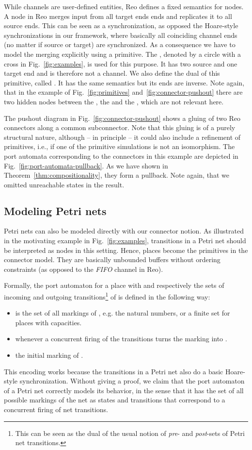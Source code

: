 \documentclass[copyright,creativecommons]{eptcs}
\begin{document}
While channels are user-defined
entities, Reo defines a fixed semantics for nodes.
A node in Reo merges input from all target ends
ends and replicates it to all source ends. This
can be seen as a  synchronization, 
as opposed the Hoare-style synchronizations
in our framework, where basically all
coinciding channel ends (no matter if source or target) 
are synchronized.
As a consequence we have to model the merging 
explicitly using a primitive. The ,
denoted by a circle with a cross in Fig.~\ref{fig:examples},
is used for this purpose. It has two source and one target end
and is therefore not a channel. We also define the dual
of this primitive, called . It has the same semantics
but its ends are inverse. Note again, that in the example
of Fig.~\ref{fig:primitives} and~\ref{fig:connector-pushout}
there are two hidden nodes between the , the 
and the , which are not relevant here.

The pushout diagram in Fig.~\ref{fig:connector-pushout} shows
a gluing of two Reo connectors along a common subconnector.
Note that this gluing is of a purely structural nature, 
although -- in principle -- it could also include a refinement of
primitives, i.e., if one of the primitive simulations is not 
an isomorphism. The port automata corresponding to the 
connectors in this example are depicted in
Fig.~\ref{fig:port-automata-pullback}. As we have shown 
in Theorem~\ref{thm:compositionality}, they form a pullback.
Note again, that we omitted unreachable states in the result.


\subsection{Modeling Petri nets}

Petri nets can also be modeled directly with our connector notion. As illustrated in the
motivating example in Fig.~\ref{fig:examples}, transitions in a Petri net
should be interpreted as nodes in this setting. Hence, places
become the primitives in the connector model. They are basically unbounded buffers
without ordering constraints (as opposed to the \emph{FIFO} channel in Reo). 


Formally, the port automaton
 for a place  with  and  respectively 
the sets of incoming and outgoing transitions\footnote{This can be seen
as the dual of the usual notion of \emph{pre}- and \emph{post}-sets of Petri net transitions.}
of  is defined in the following way:
\begin{itemize}
  \item  is the set of all markings of , e.g. the natural numbers, or a
  finite set for places with capacities.
  \item  whenever a concurrent firing of
  the transitions  turns the marking  into . 
  \item  the initial marking of .
\end{itemize}
This encoding works because the transitions in a Petri net also do a basic
Hoare-style synchronization. Without giving a proof, we claim that the port
automaton  of a Petri net  correctly models its behavior, in the
sense that it has the set of all possible markings of the net as states and
transitions that correspond to a concurrent firing of net transitions.
\end{document}
